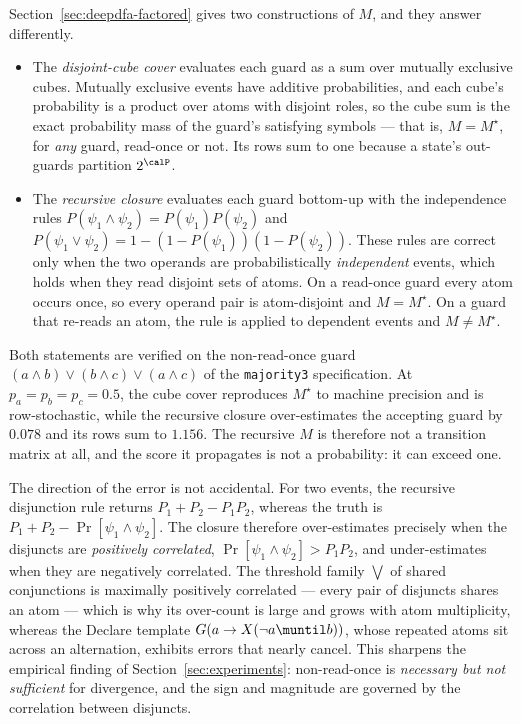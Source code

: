 Section~\ref{sec:deepdfa-factored} gives two constructions of $M$, and they answer differently.

\begin{itemize}
  \item The \emph{disjoint-cube cover} evaluates each guard as a sum over mutually exclusive cubes. Mutually exclusive events have additive probabilities, and each cube's probability is a product over atoms with disjoint roles, so the cube sum is the exact probability mass of the guard's satisfying symbols --- that is, $M = M^\star$, for \emph{any} guard, read-once or not. Its rows sum to one because a state's out-guards partition $2^\calP$.
  \item The \emph{recursive closure} evaluates each guard bottom-up with the independence rules $P(\psi_1 \land \psi_2) = P(\psi_1)P(\psi_2)$ and $P(\psi_1 \lor \psi_2) = 1 - (1-P(\psi_1))(1-P(\psi_2))$. These rules are correct only when the two operands are probabilistically \emph{independent} events, which holds when they read disjoint sets of atoms. On a read-once guard every atom occurs once, so every operand pair is atom-disjoint and $M = M^\star$. On a guard that re-reads an atom, the rule is applied to dependent events and $M \neq M^\star$.
\end{itemize}

Both statements are verified on the non-read-once guard $(a \land b) \lor (b \land c) \lor (a \land c)$ of the \texttt{majority3} specification. At $p_a = p_b = p_c = 0.5$, the cube cover reproduces $M^\star$ to machine precision and is row-stochastic, while the recursive closure over-estimates the accepting guard by $0.078$ and its rows sum to $1.156$. The recursive $M$ is therefore not a transition matrix at all, and the score it propagates is not a probability: it can exceed one.

The direction of the error is not accidental. For two events, the recursive disjunction rule returns $P_1 + P_2 - P_1 P_2$, whereas the truth is $P_1 + P_2 - \Pr[\psi_1 \land \psi_2]$. The closure therefore over-estimates precisely when the disjuncts are \emph{positively correlated}, $\Pr[\psi_1 \land \psi_2] > P_1 P_2$, and under-estimates when they are negatively correlated. The threshold family $\bigvee$ of shared conjunctions is maximally positively correlated --- every pair of disjuncts shares an atom --- which is why its over-count is large and grows with atom multiplicity, whereas the Declare template $G(a \rightarrow X(\lnot a \muntil b))$, whose repeated atoms sit across an alternation, exhibits errors that nearly cancel. This sharpens the empirical finding of Section~\ref{sec:experiments}: non-read-once is \emph{necessary but not sufficient} for divergence, and the sign and magnitude are governed by the correlation between disjuncts.

